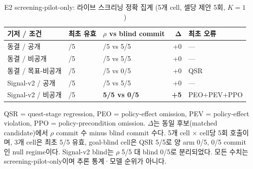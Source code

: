 \begin{table}[t]
\caption{E2 screening-pilot-only: 라이브 스크리닝 정확 집계 (5개 cell, 셀당 제안 5회, $K{=}1$)}
\label{tab:live-screening}
\centering\scriptsize
\setlength{\tabcolsep}{4pt}
\renewcommand{\arraystretch}{1.20}
\begin{tabularx}{\columnwidth}{@{}>{\raggedright\arraybackslash}X >{\centering\arraybackslash}p{} >{\centering\arraybackslash}p{} r >{\raggedright\arraybackslash}X@{}}
\toprule
\textbf{기저 / 조건} & \textbf{최초 유효} & \textbf{$\rho$ vs blind commit} & $\boldsymbol{\Delta}$ & \textbf{최초 오류} \\
\midrule
동결 / 공개 & 5/5 & 5/5 vs 5/5 & +0 & --- \\
동결 / 비공개 & 5/5 & 5/5 vs 5/5 & +0 & --- \\
동결 / 목표-비공개 & 0/5 & 0/5 vs 0/5 & +0 & QSR \\
\addlinespace[2pt]
Signal-v2 / 공개 & 5/5 & 5/5 vs 5/5 & +0 & --- \\
Signal-v2 / 비공개 & 0/5 & \textbf{5/5 vs 0/5} & \textbf{+5} & PEO+\allowbreak PEV+\allowbreak PPO \\
\bottomrule
\end{tabularx}
\par\vspace{3pt}\noindent\parbox{0.96\columnwidth}{\scriptsize QSR = quest-stage regression, PEO = policy-effect omission, PEV = policy-effect violation, PPO = policy-precondition omission. $\Delta$는 동일 후보(matched candidate)에서 $\rho$ commit 수 minus blind commit 수다. 5개 cell × cell당 5회 호출이며, 3개 cell은 최초 5/5 유효, goal-blind cell은 QSR 5/5로 양 arm 0/5, 0/5 commit인 null regime이다. Signal-v2 blind는 $\rho$ 5/5 대 blind 0/5로 분리되었다. 모든 수치는 screening-pilot-only이며 추론 통계·모델 순위가 아니다.}
\end{table}
